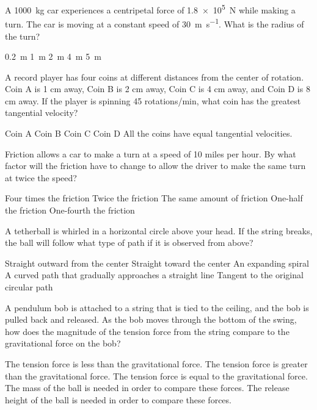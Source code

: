 \documentclass{../../../oss-ap12ibhl-print}
\begin{document}
\genheader


\begin{questions}
  
  \question A \SI{1000}{\kilo\gram} car experiences a centripetal force of
  \SI{1.8e5}{\newton} while making a turn. The car is moving at a constant
  speed of \SI{30}{\metre\per\second}. What is the radius of the turn?
  \begin{choices}
    \choice\SI{.2}{\metre}
    \choice\SI{1}{\metre}
    \choice\SI{2}{\metre}
    \choice\SI{4}{\metre}
    \choice\SI{5}{\metre}
  \end{choices}

  \question A record player has four coins at different distances from the
  center of rotation. Coin A is 1 cm away, Coin B is 2 cm away, Coin C is 4 cm
  away, and Coin D is 8 cm away. If the player is spinning 45 rotations/min,
  what coin has the greatest tangential velocity?
  \begin{choices}
    \choice Coin A
    \choice Coin B
    \choice Coin C
    \choice Coin D
    \choice All the coins have equal tangential velocities.
  \end{choices}

  \question Friction allows a car to make a turn at a speed of 10 miles per
  hour. By what factor will the friction have to change to allow the driver to
  make the same turn at twice the speed?
  \begin{choices}
    \choice Four times the friction
    \choice Twice the friction
    \choice The same amount of friction
    \choice One-half the friction
    \choice One-fourth the friction
  \end{choices}

  \question A tetherball is whirled in a horizontal circle above your head. If
  the string breaks, the ball will follow what type of path if it is observed
  from above?
  \begin{choices}
    \choice Straight outward from the center
    \choice Straight toward the center
    \choice An expanding spiral
    \choice A curved path that gradually approaches a straight line
    \choice Tangent to the original circular path
  \end{choices}

  \question A pendulum bob is attached to a string that is tied to the ceiling,
  and the bob is pulled back and released. As the bob moves through the bottom
  of the swing, how does the magnitude of the tension force from the string
  compare to the gravitational force on the bob?
  \begin{choices}
    \choice The tension force is less than the gravitational force.
    \choice The tension force is greater than the gravitational force.
    \choice The tension force is equal to the gravitational force.
    \choice The mass of the ball is needed in order to compare these forces.
    \choice The release height of the ball is needed in order to compare these
    forces.
  \end{choices}


\end{questions}
\end{document}
